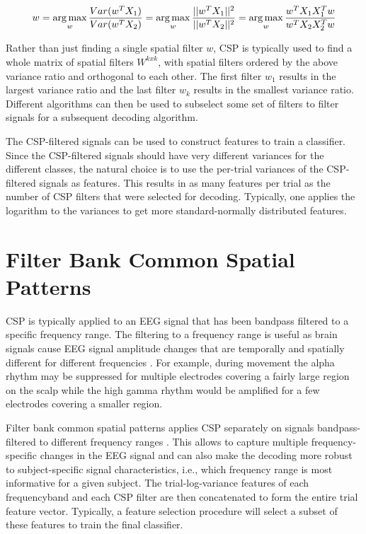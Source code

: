 \begin{equation*}
w=\operatorname*{arg\,max}_w\frac{Var(w^T X_1)}{Var(w^T X_2)}= \operatorname*{arg\,max}_w\frac{||w^T X_1||^2}{||w^T X_2||^2}=\operatorname*{arg\,max}_w\frac{w^T X_1 X_1^T w}{w^T X_2 X_2^T w}
\end{equation*}

    Rather than just finding a single spatial filter $w$, CSP is typically
used to find a whole matrix of spatial filters $W^{kxk}$, with spatial
filters ordered by the above variance ratio and orthogonal to each
other. The first filter $w_1$ results in the largest variance ratio
and the last filter $w_k$ results in the smallest variance ratio.
Different algorithms can then be used to subselect some set of filters
to filter signals for a subsequent decoding algorithm.

The CSP-filtered signals can be used to construct features to train a
classifier. Since the CSP-filtered signals should have very different
variances for the different classes, the natural choice is to use the
per-trial variances of the CSP-filtered signals as features. This
results in as many features per trial as the number of CSP filters that
were selected for decoding. Typically, one applies the logarithm to the
variances to get more standard-normally distributed features.


\section{Filter Bank Common Spatial
Patterns}\label{filter-bank-common-spatial-patterns}

    CSP is typically applied to an EEG signal that has been bandpass
filtered to a specific frequency range. The filtering to a frequency
range is useful as brain signals cause EEG signal amplitude changes that
are temporally and spatially different for different frequencies
\citep{ang_filter_2008}. For example, during movement the
alpha rhythm may be suppressed for multiple electrodes covering a fairly
large region on the scalp while the high gamma rhythm would be amplified
for a few electrodes covering a smaller region.

    Filter bank common spatial patterns applies CSP separately on signals
bandpass-filtered to different frequency ranges
\cite{ang_filter_2008,chin_multi-class_2009}. This allows
to capture multiple frequency-specific changes in the EEG signal and can
also make the decoding more robust to subject-specific signal
characteristics, i.e., which frequency range is most informative for a
given subject. The trial-log-variance features of each frequencyband and
each CSP filter are then concatenated to form the entire trial feature
vector. Typically, a feature selection procedure will select a subset of
these features to train the final classifier.

